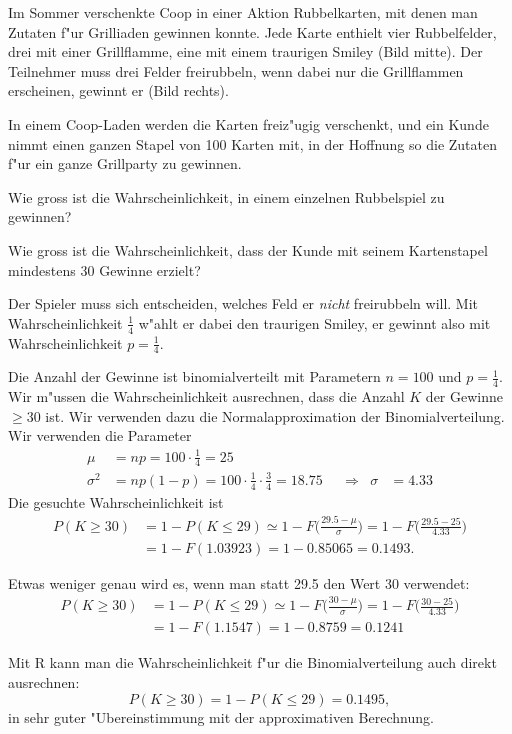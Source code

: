 Im Sommer verschenkte Coop in einer Aktion Rubbelkarten, mit denen
man Zutaten f"ur Grilliaden gewinnen konnte.
Jede Karte enthielt vier Rubbelfelder, drei mit einer Grillflamme,
eine mit einem traurigen Smiley (Bild mitte).
Der Teilnehmer muss drei Felder freirubbeln, wenn dabei nur die Grillflammen
erscheinen, gewinnt er (Bild rechts).
\begin{center}
\end{center}
In einem Coop-Laden werden die Karten freiz"ugig verschenkt, und ein Kunde
nimmt einen ganzen Stapel von 100 Karten mit, in der Hoffnung so die Zutaten
f"ur ein ganze Grillparty zu gewinnen.

\begin{teilaufgaben}
\item Wie gross ist die Wahrscheinlichkeit, in einem einzelnen Rubbelspiel zu
gewinnen?
\item Wie gross ist die Wahrscheinlichkeit, dass der Kunde mit seinem 
Kartenstapel mindestens  30 Gewinne erzielt?
\end{teilaufgaben}

\begin{loesung}
\begin{teilaufgaben}
\item
Der Spieler muss sich entscheiden, welches Feld er {\em nicht} freirubbeln will.
Mit Wahrscheinlichkeit $\frac14$ w"ahlt er dabei den traurigen Smiley,
er gewinnt also mit Wahrscheinlichkeit $p=\frac14$.
\item
Die Anzahl der Gewinne ist binomialverteilt mit Parametern $n=100$ und
$p=\frac14$.
Wir m"ussen die Wahrscheinlichkeit ausrechnen, dass die Anzahl $K$ der
Gewinne $\ge 30$ ist. 
Wir verwenden dazu die Normalapproximation der Binomialverteilung.
Wir verwenden die Parameter
\[
\begin{aligned}
\mu&=np = 100\cdot \frac14=25\\
\sigma^2&=np(1-p)=100\cdot\frac14\cdot\frac34=18.75&&\Rightarrow&\sigma&=4.33
\end{aligned}
\]
Die gesuchte Wahrscheinlichkeit ist
\begin{align*}
P(K\ge 30)
&=1-P(K \le 29)
\simeq
1-F\biggl(\frac{29.5-\mu}{\sigma}\biggr)
=
1-F\biggl(\frac{29.5-25}{4.33}\biggr)
\\
&=
1-F(1.03923)=1-0.85065=0.1493.
\end{align*}

Etwas weniger genau wird es, wenn man statt 29.5 den Wert 30 verwendet:
\begin{align*}
P(K\ge 30)
&=1-P(K \le 29)
\simeq
1-F\biggl(\frac{30-\mu}{\sigma}\biggr)
=
1-F\biggl(\frac{30-25}{4.33}\biggr)
\\
&=
1-F(1.1547)=1-0.8759=0.1241
\end{align*}


Mit R kann man die Wahrscheinlichkeit f"ur die Binomialverteilung
auch direkt ausrechnen:
\[
P(K\ge 30)
=1-P(K\le 29)=0.1495,
\]
in sehr guter "Ubereinstimmung mit der approximativen Berechnung.
\qedhere
\end{teilaufgaben}
\end{loesung}

